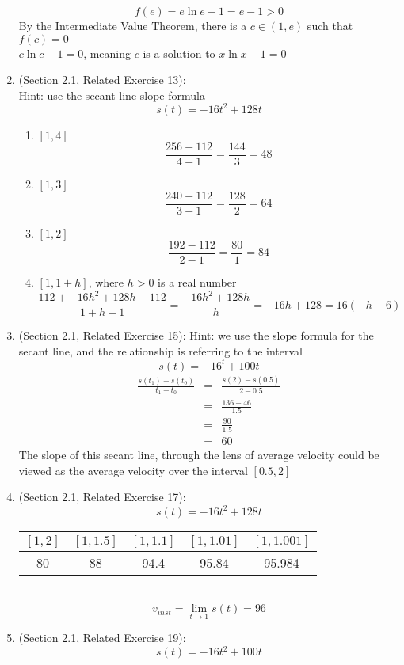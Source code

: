 \documentclass{article}
\begin{document}
\begin{enumerate}
		$$f(e) = e \ln{e} - 1 = e - 1 > 0$$
		By the Intermediate Value Theorem, there is a $c \in (1, e)$ such that $f(c) = 0$ \\
		$c \ln{c} - 1 = 0$, meaning $c$ is a solution to $x \ln{x} - 1 = 0$
    \item (Section 2.1, Related Exercise 13):
    	\\Hint: use the secant line slope formula
    	$$s(t) = -16t^2 + 128t$$
        \begin{enumerate}
    	    \item $[1, 4]$
    	        $$\frac{256 - 112}{4 - 1} = \frac{144}{3} = 48$$
    	    \item $[1, 3]$
    	        $$\frac{240 - 112}{3 - 1} = \frac{128}{2} = 64$$
    	    \item $[1, 2]$
    	        $$\frac{192 - 112}{2 - 1} = \frac{80}{1} = 84$$
    	    \item $[1, 1 + h]$, where $h > 0$ is a real number
    	        $$\frac{112 + -16h^2 + 128h - 112}{1 + h - 1} = \frac{-16h^2 + 128h}{h} = -16h + 128 = 16(-h + 6)$$
        \end{enumerate}
    \item (Section 2.1, Related Exercise 15):
    	Hint: we use the slope formula for the secant line, and the relationship is referring to the interval
    	$$s(t) = -16^t + 100t$$
    	\begin{eqnarray}
    	\frac{s(t_1) - s(t_0)}{t_1 - t_0} &=& \frac{s(2) - s(0.5)}{2 - 0.5} \\
    	&=& \frac{136 - 46}{1.5} \\
    	&=& \frac{90}{1.5} \\
    	&=& 60
    	\end{eqnarray}
    	The slope of this secant line, through the lens of average velocity could be viewed as the average velocity over the interval $[0.5, 2]$
    \item (Section 2.1, Related Exercise 17):
        $$s(t) = -16t^2 + 128t$$
    
	    \begin{tabular}{| c | c | c | c | c |}
            \hline
            $[1,2]$&$[1,1.5]$&$[1,1.1]$&$[1,1.01]$&$[1,1.001]$ \\
            \hline
    	    80 & 88 & 94.4 & 95.84 & 95.984 \\
            \hline
        \end{tabular} \\

    	$$v_{inst} = \lim_{t \to 1}{s(t)} = 96$$
    \item (Section 2.1, Related Exercise 19):
	    $$s(t) = -16t^2 + 100t$$
    

\end{enumerate}
\end{document}
